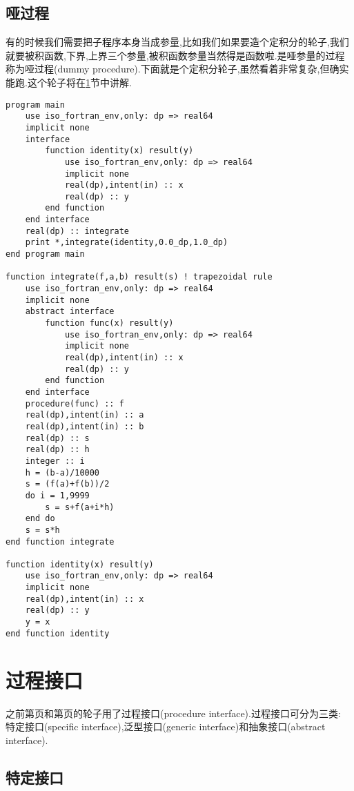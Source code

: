 \subsection{哑过程}
有的时候我们需要把子程序本身当成参量,比如我们如果要造个定积分的轮子,我们就要被积函数,下界,上界三个参量,被积函数参量当然得是函数啦.是哑参量的过程称为哑过程(dummy procedure).下面就是个定积分轮子,虽然看着非常复杂,但确实能跑.这个轮子将在\ref{fortran_interface}节中讲解.\label{dummy_procedure_program}
\begin{lstlisting}
program main
    use iso_fortran_env,only: dp => real64
    implicit none
    interface
        function identity(x) result(y)
            use iso_fortran_env,only: dp => real64
            implicit none
            real(dp),intent(in) :: x
            real(dp) :: y
        end function
    end interface
    real(dp) :: integrate
    print *,integrate(identity,0.0_dp,1.0_dp)
end program main

function integrate(f,a,b) result(s) ! trapezoidal rule
    use iso_fortran_env,only: dp => real64
    implicit none
    abstract interface
        function func(x) result(y)
            use iso_fortran_env,only: dp => real64
            implicit none
            real(dp),intent(in) :: x
            real(dp) :: y
        end function
    end interface
    procedure(func) :: f
    real(dp),intent(in) :: a
    real(dp),intent(in) :: b
    real(dp) :: s
    real(dp) :: h
    integer :: i
    h = (b-a)/10000
    s = (f(a)+f(b))/2
    do i = 1,9999
        s = s+f(a+i*h)
    end do
    s = s*h
end function integrate

function identity(x) result(y)
    use iso_fortran_env,only: dp => real64
    implicit none
    real(dp),intent(in) :: x
    real(dp) :: y
    y = x
end function identity
\end{lstlisting}

\section{过程接口}\label{fortran_interface}

之前第\pageref{assumed-shape_array_program}页和第\pageref{dummy_procedure_program}页的轮子用了过程接口(procedure interface).过程接口可分为三类: 特定接口(specific interface),泛型接口(generic interface)和抽象接口(abstract interface).

\subsection{特定接口}

